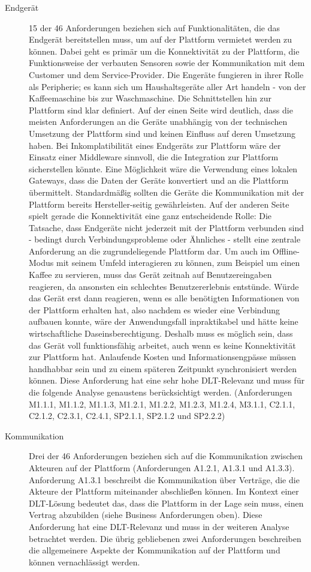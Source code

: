\begin{description}
  \item[Endgerät] 15 der 46 Anforderungen beziehen sich auf Funktionalitäten, die das Endgerät bereitstellen muss, um auf der Plattform vermietet werden zu können. Dabei geht es primär um die Konnektivität zu der Plattform, die Funktionsweise der verbauten Sensoren sowie der Kommunikation mit dem Customer und dem Service-Provider. Die Engeräte fungieren in ihrer Rolle als Peripherie; es kann sich um Haushaltsgeräte aller Art handeln - von der Kaffeemaschine bis zur Waschmaschine. Die Schnittstellen hin zur Plattform sind klar definiert. Auf der einen Seite wird deutlich, dass die meisten Anforderungen an die Geräte unabhängig von der technischen Umsetzung der Plattform sind und keinen Einfluss auf deren Umsetzung haben. Bei Inkomplatibilität eines Endgeräts zur Plattform wäre der Einsatz einer Middleware sinnvoll, die die Integration zur Plattform sicherstellen könnte. Eine Möglichkeit wäre die Verwendung eines lokalen Gateways, dass die Daten der Geräte konvertiert und an die Plattform übermittelt. Standardmäßig sollten die Geräte die Kommunikation mit der Plattform bereits Hersteller-seitig gewährleisten. Auf der anderen Seite spielt gerade die Konnektivität eine ganz entscheidende Rolle: Die Tatsache, dass Endgeräte nicht jederzeit mit der Plattform verbunden sind - bedingt durch Verbindungsprobleme oder Ähnliches - stellt eine zentrale Anforderung an die zugrundeliegende Plattform dar. Um auch im Offline-Modus mit seinem Umfeld interagieren zu können, zum Beispiel um einen Kaffee zu servieren, muss das Gerät zeitnah auf Benutzereingaben reagieren, da ansonsten ein schlechtes Benutzererlebnis entstünde. Würde das Gerät erst dann reagieren, wenn es alle benötigten Informationen von der Plattform erhalten hat, also nachdem es wieder eine Verbindung aufbauen konnte, wäre der Anwendungsfall inpraktikabel und hätte keine wirtschaftliche Daseinsberechtigung. Deshalb muss es möglich sein, dass das Gerät voll funktionsfähig arbeitet, auch wenn es keine Konnektivität zur Plattform hat. Anlaufende Kosten und Informationsengpässe müssen handhabbar sein und zu einem späteren Zeitpunkt synchronisiert werden können. Diese Anforderung hat eine sehr hohe \ac{DLT}-Relevanz und muss für die folgende Analyse genaustens berücksichtigt werden. (Anforderungen M1.1.1, M1.1.2, M1.1.3, M1.2.1, M1.2.2, M1.2.3, M1.2.4, M3.1.1, C2.1.1, C2.1.2, C2.3.1, C2.4.1, SP2.1.1, SP2.1.2 und SP2.2.2)
  \item[Kommunikation] Drei der 46 Anforderungen beziehen sich auf die Kommunikation zwischen Akteuren auf der Plattform (Anforderungen A1.2.1, A1.3.1 und A1.3.3). Anforderung A1.3.1 beschreibt die Kommunikation über Verträge, die die Akteure der Plattform miteinander abschließen können. Im Kontext einer \ac{DLT}-Lösung bedeutet das, dass die Plattform in der Lage sein muss, einen Vertrag abzubilden (siehe Business Anforderungen oben). Diese Anforderung hat eine \ac{DLT}-Relevanz und muss in der weiteren Analyse betrachtet werden. Die übrig gebliebenen zwei Anforderungen beschreiben die allgemeinere Aspekte der Kommunikation auf der Plattform und können vernachlässigt werden.

\end{description}
